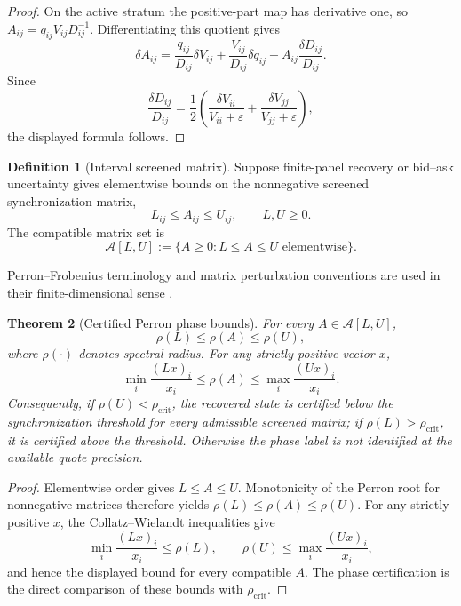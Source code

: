 \documentclass[11pt,a4paper]{amsart}
\theoremstyle{plain}
\newtheorem{theorem}{Theorem}[section]
\theoremstyle{definition}
\newtheorem{definition}[theorem]{Definition}
\theoremstyle{remark}
\newcommand{\cA}{\mathcal{A}}
\newcommand{\eps}{\varepsilon}
\begin{document}
\begin{proof}
On the active stratum the positive-part map has derivative one, so
\(A_{ij}=q_{ij}V_{ij}D_{ij}^{-1}\).  Differentiating this quotient gives
\[
        \delta A_{ij}
        =
        \frac{q_{ij}}{D_{ij}}\delta V_{ij}
        +
        \frac{V_{ij}}{D_{ij}}\delta q_{ij}
        -
        A_{ij}\frac{\delta D_{ij}}{D_{ij}}.
\]
Since
\[
        \frac{\delta D_{ij}}{D_{ij}}
        =
        \frac12
        \left(
        \frac{\delta V_{ii}}{V_{ii}+\eps}
        +
        \frac{\delta V_{jj}}{V_{jj}+\eps}
        \right),
\]
the displayed formula follows.
\end{proof}

\begin{definition}[Interval screened matrix]\label{def:interval-screened-matrix}
Suppose finite-panel recovery or bid--ask uncertainty gives elementwise bounds on the
nonnegative screened synchronization matrix,
\[
        L_{ij}\le A_{ij}\le U_{ij},\qquad L,U\ge0 .
\]
The compatible matrix set is
\[
        \cA[L,U]:=\{A\ge0:L\le A\le U\text{ elementwise}\}.
\]
\end{definition}

Perron--Frobenius terminology and matrix perturbation conventions are used in their
finite-dimensional sense \cite{bermanPlemmons1994,hornJohnson2012}.

\begin{theorem}[Certified Perron phase bounds]\label{thm:certified-perron-phase}
For every \(A\in\cA[L,U]\),
\[
        \rho(L)\le \rho(A)\le \rho(U),
\]
where \(\rho(\cdot)\) denotes spectral radius.  For any strictly positive vector \(x\),
\[
        \min_i\frac{(Lx)_i}{x_i}
        \le
        \rho(A)
        \le
        \max_i\frac{(Ux)_i}{x_i}.
\]
Consequently, if \(\rho(U)<\rho_{\mathrm{crit}}\), the recovered state is certified below
the synchronization threshold for every admissible screened matrix; if
\(\rho(L)>\rho_{\mathrm{crit}}\), it is certified above the threshold.  Otherwise the phase
label is not identified at the available quote precision.
\end{theorem}

\begin{proof}
Elementwise order gives \(L\le A\le U\).  Monotonicity of the Perron root for nonnegative matrices
therefore yields \(\rho(L)\le\rho(A)\le\rho(U)\).  For any strictly positive \(x\), the
Collatz--Wielandt inequalities give
\[
        \min_i\frac{(Lx)_i}{x_i}
        \le \rho(L),
        \qquad
        \rho(U)\le
        \max_i\frac{(Ux)_i}{x_i},
\]
and hence the displayed bound for every compatible \(A\).  The phase certification is the direct
comparison of these bounds with \(\rho_{\mathrm{crit}}\).
\end{proof}
\end{document}
